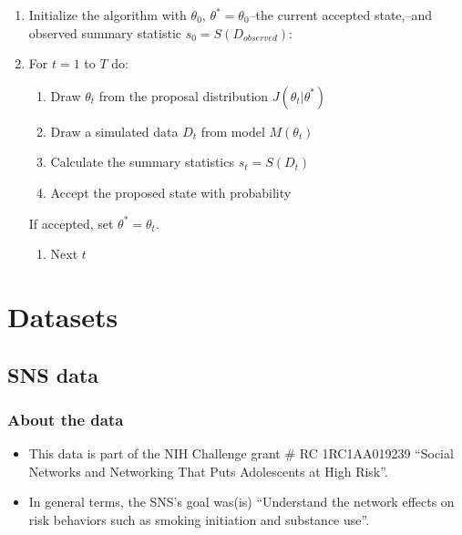 \documentclass[]{book}
\providecommand{\tightlist}{%
  \setlength{\itemsep}{0pt}\setlength{\parskip}{0pt}}
\begin{document}
\begin{enumerate}
\def\labelenumi{\arabic{enumi}.}
\item
  Initialize the algorithm with \(\theta_0\), \(\theta^* =\theta_0\)--the current accepted
  state,--and observed summary statistic \(s_0 = S(D_{observed})\):
\item
  For \(t = 1\) to \(T\) do:

  \begin{enumerate}
  \def\labelenumii{\alph{enumii}.}
  \item
    Draw \(\theta_t\) from the proposal distribution \(J(\theta_t|\theta^*)\)
  \item
    Draw a simulated data \(D_t\) from model \(M(\theta_t)\)
  \item
    Calculate the summary statistics \(s_t = S(D_t)\)
  \item
    Accept the proposed state with probability
  \end{enumerate}

  If accepted, set \(\theta^* = \theta_t\).

  \begin{enumerate}
  \def\labelenumii{\alph{enumii}.}
  \setcounter{enumii}{4}
  \tightlist
  \item
    Next \(t\)
  \end{enumerate}
\end{enumerate}

\cleardoublepage

\hypertarget{appendix-appendix}{%
\appendix}


\hypertarget{datasets-1}{%
\chapter{Datasets}\label{datasets-1}}

\hypertarget{sns-data}{%
\section{SNS data}\label{sns-data}}

\hypertarget{about-the-data}{%
\subsection{About the data}\label{about-the-data}}

\begin{itemize}
\item
  This data is part of the NIH Challenge grant \# RC 1RC1AA019239 ``Social
  Networks and Networking That Puts Adolescents at High Risk''.
\item
  In general terms, the SNS's goal was(is) ``Understand the network effects on
  risk behaviors such as smoking initiation and substance use''.
\end{itemize}
\end{document}
